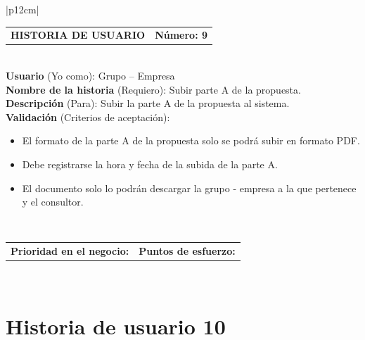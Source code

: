 \documentclass[11pt,letterpaper]{report}
\begin{document}
	\begin{center}	
		\begin{tabular}{|p{12cm}|}
			\hline
			\begin{tabular}{c|c}
				\textbf{HISTORIA DE USUARIO} & \textbf{Número: 9} \\
			\end{tabular} \\ \hline
			\textbf{Usuario} (Yo como): Grupo – Empresa \\ \hline
			\textbf{Nombre de la historia} (Requiero): Subir parte A de la propuesta. \\ \hline
			\textbf{Descripción} (Para): Subir la parte A de la propuesta al sistema. \\ \hline
			\textbf{Validación} (Criterios de aceptación): \\
			\begin{minipage}{12cm}
				\begin{itemize}
					\item El formato de la parte A de la propuesta solo se podrá subir en formato PDF.
					\item Debe registrarse la hora y fecha de la subida de la parte A.
					\item El documento solo lo podrán descargar la grupo - empresa a la que pertenece y el consultor.
				\end{itemize}
			\end{minipage} \\ \hline
			\begin{tabular}{c|c}
				\textbf{Prioridad en el negocio: } & \textbf{Puntos de esfuerzo: } \\
			\end{tabular} \\ \hline
		\end{tabular}
	\end{center}
	
	\section{Historia de usuario 10}
	
\end{document}
